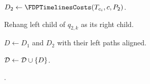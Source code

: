 \begin{algorithm}
{{{            

            $D_2\gets \FDPTimelinesCosts\br{T_{c_i}, c, P_2}$.

            Rehang left child of $q_{2, k}$ as its right child.

            $D\gets D_1$ and $D_2$ with their left paths aligned. 

            $\mathcal{D}\gets\mathcal{D}\cup\mathopen{}\left\{ D \right\}$.
        }
    }
    .
    }

\end{algorithm}
